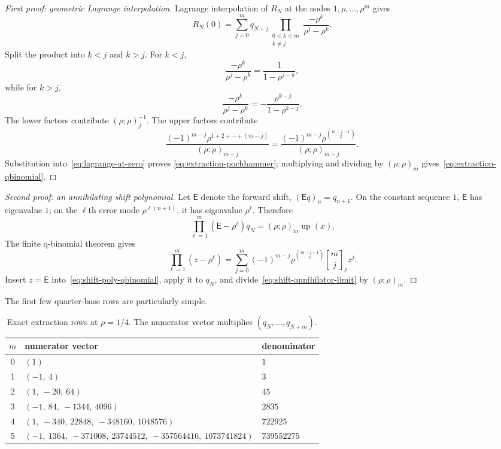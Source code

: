 \documentclass[11pt,a4paper]{article}
\theoremstyle{remark}
\newcommand{\up}{\operatorname{up}}
\newcommand{\E}{\mathsf{E}}
\newcommand{\qbinom}[3]{\genfrac{[}{]}{0pt}{}{#1}{#2}_{#3}}
\begin{document}
\begin{proof}[First proof: geometric Lagrange interpolation]
Lagrange interpolation of $R_N$ at the nodes
$1,\rho,\ldots,\rho^m$ gives
\begin{equation}
 R_N(0)=\sum_{j=0}^{m}q_{N+j}
 \prod_{\substack{0\le k\le m\\k\ne j}}
 \frac{-\rho^k}{\rho^j-\rho^k}.
 \label{eq:lagrange-at-zero}
\end{equation}
Split the product into $k<j$ and $k>j$.  For $k<j$,
\[
 \frac{-\rho^k}{\rho^j-\rho^k}
 =\frac1{1-\rho^{j-k}},
\]
while for $k>j$,
\[
 \frac{-\rho^k}{\rho^j-\rho^k}
 =-\frac{\rho^{k-j}}{1-\rho^{k-j}}.
\]
The lower factors contribute $(\rho;\rho)_j^{-1}$.  The upper factors
contribute
\[
 \frac{(-1)^{m-j}\rho^{1+2+\cdots+(m-j)}}
 {(\rho;\rho)_{m-j}}
 =\frac{(-1)^{m-j}\rho^{\binom{m-j+1}{2}}}
 {(\rho;\rho)_{m-j}}.
\]
Substitution into~\eqref{eq:lagrange-at-zero} proves
\eqref{eq:extraction-pochhammer}; multiplying and dividing by
$(\rho;\rho)_m$ gives~\eqref{eq:extraction-qbinomial}.
\end{proof}

\begin{proof}[Second proof: an annihilating shift polynomial]
Let $\E$ denote the forward shift, $(\E q)_n=q_{n+1}$.  On the constant
sequence $1$, $\E$ has eigenvalue $1$; on the $\ell$th error mode
$\rho^{\ell(n+1)}$, it has eigenvalue $\rho^\ell$.  Therefore
\begin{equation}
 \prod_{\ell=1}^{m}(\E-\rho^\ell)q_N
 =(\rho;\rho)_m\up(x).
 \label{eq:shift-annihilator-limit}
\end{equation}
The finite q-binomial theorem gives
\begin{equation}
 \prod_{\ell=1}^{m}(z-\rho^\ell)
 =\sum_{j=0}^{m}(-1)^{m-j}
 \rho^{\binom{m-j+1}{2}}
 \qbinom{m}{j}{\rho}z^j.
 \label{eq:shift-poly-qbinomial}
\end{equation}
Insert $z=\E$ into~\eqref{eq:shift-poly-qbinomial}, apply it to $q_N$, and
divide~\eqref{eq:shift-annihilator-limit} by $(\rho;\rho)_m$.
\end{proof}

The first few quarter-base rows are particularly simple.

\begin{table}[htbp]
\centering
\caption{Exact extraction rows at $\rho=1/4$.  The numerator vector multiplies
$(q_N,\ldots,q_{N+m})$.}
\label{tab:extraction-rows}
\begin{tabular}{c@{\qquad}l@{\qquad}l}
\toprule
$m$ & numerator vector & denominator\\
\midrule
0 & $(1)$ & $1$\\
1 & $(-1,\ 4)$ & $3$\\
2 & $(1,\ -20,\ 64)$ & $45$\\
3 & $(-1,\ 84,\ -1344,\ 4096)$ & $2835$\\
4 & $(1,\ -340,\ 22848,\ -348160,\ 1048576)$ & $722925$\\
5 & $(-1,\ 1364,\ -371008,\ 23744512,\ -357564416,\ 1073741824)$
& $739552275$\\
\bottomrule
\end{tabular}
\end{table}
\end{document}
